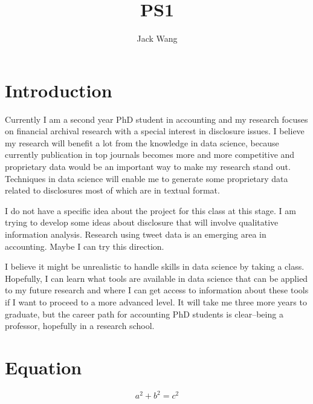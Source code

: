 \documentclass{article}
\title{PS1}
\author{Jack Wang}
\begin{document}
\maketitle

\section{Introduction}

Currently I am a second year PhD student in accounting and my research focuses on financial archival research with a special interest in disclosure issues. I believe my research will benefit a lot from the knowledge in data science, because currently publication in top journals becomes more and more competitive and proprietary data would be an important way to make my research stand out. Techniques in data science will enable me to generate some proprietary data related to disclosures most of which are in textual format.

I do not have a specific idea about the project for this class at this stage. I am trying to develop some ideas about disclosure that will involve qualitative information analysis. Research using tweet data is an emerging area in accounting. Maybe I can try this direction.

I believe it might be unrealistic to handle skills in data science by taking a class. Hopefully, I can learn what tools are available in data science that can be applied to my future research and where I can get access to information about these tools if I want to proceed to a more advanced level. It will take me three more years to graduate, but the career path for accounting PhD students is clear--being a professor, hopefully in a research school.


\section{Equation}

\[a^2+b^2 = c^2\]
\end{document}
